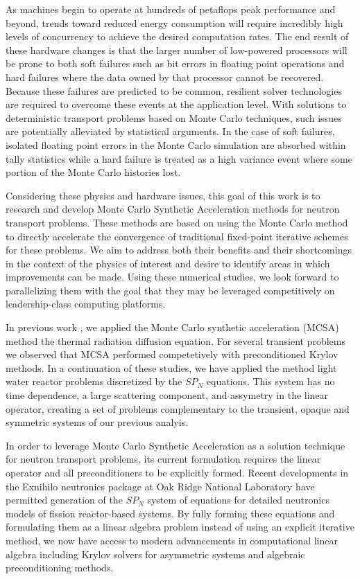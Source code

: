 \documentclass[letterpaper,12pt]{article}
\begin{document}
As machines begin to operate at hundreds of petaflops peak performance
and beyond, trends toward reduced energy consumption will require
incredibly high levels of concurrency to achieve the desired
computation rates. The end result of these hardware changes is that
the larger number of low-powered processors will be prone to both soft
failures such as bit errors in floating point operations and hard
failures where the data owned by that processor cannot be
recovered. Because these failures are predicted to be common,
resilient solver technologies are required to overcome these events at
the application level. With solutions to deterministic transport
problems based on Monte Carlo techniques, such issues are potentially
alleviated by statistical arguments. In the case of soft failures,
isolated floating point errors in the Monte Carlo simulation are
absorbed within tally statistics while a hard failure is treated as a
high variance event where some portion of the Monte Carlo histories
lost.

Considering these physics and hardware issues, this goal of this work
is to research and develop Monte Carlo Synthetic Acceleration methods
for neutron transport problems. These methods are based on using the
Monte Carlo method to directly accelerate the convergence of
traditional fixed-point iterative schemes for these problems. We aim
to address both their benefits and their shortcomings in the context
of the physics of interest and desire to identify areas in which
improvements can be made. Using these numerical studies, we look
forward to parallelizing them with the goal that they may be leveraged
competitively on leadership-class computing platforms.

In previous work \cite{evans_monte_2012}, we applied the Monte Carlo
synthetic acceleration (MCSA) method the thermal radiation diffusion
equation. For several transient problems we observed that MCSA
performed competetively with preconditioned Krylov methods. In a
continuation of these studies, we have applied the method light water
reactor problems discretized by the $SP_N$ equations. This system has
no time dependence, a large scattering component, and assymetry in the
linear operator, creating a set of problems complementary to the
transient, opaque and symmetric systems of our previous analyis.

In order to leverage Monte Carlo Synthetic Acceleration as a solution
technique for neutron transport problems, its current formulation
requires the linear operator and all preconditioners to be explicitly
formed. Recent developments in the Exnihilo neutronics package at Oak
Ridge National Laboratory have permitted generation of the $SP_N$
system of equations for detailed neutronics models of fission
reactor-based systems\cite{evans_simplified_2013}. By fully forming
these equations and formulating them as a linear algebra problem
instead of using an explicit iterative method, we now have access to
modern advancements in computational linear algebra including Krylov
solvers for asymmetric systems and algebraic preconditioning methods.
\end{document}
